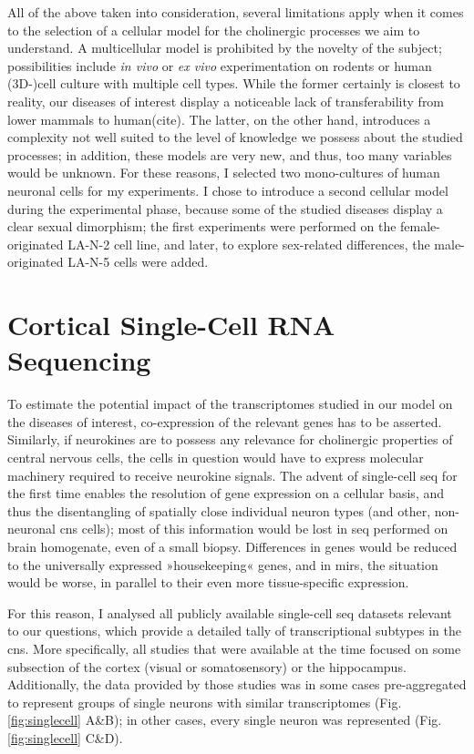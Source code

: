 All of the above taken into consideration, several limitations apply when it comes to the selection of a cellular model for the cholinergic processes we aim to understand. A multicellular model is prohibited by the novelty of the subject; possibilities include \textit{in vivo} or \textit{ex vivo} experimentation on rodents or human (3D-)cell culture with multiple cell types. While the former certainly is closest to reality, our diseases of interest display a noticeable lack of transferability from lower mammals to human(cite). The latter, on the other hand, introduces a complexity not well suited to the level of knowledge we possess about the studied processes; in addition, these models are very new, and thus, too many variables would be unknown. For these reasons, I selected two mono-cultures of human neuronal cells for my experiments. I chose to introduce a second cellular model during the experimental phase, because some of the studied diseases display a clear sexual dimorphism; the first experiments were performed on the female-originated LA-N-2 cell line, and later, to explore sex-related differences, the male-originated LA-N-5 cells were added.

\section{Cortical Single-Cell RNA Sequencing}
To estimate the potential impact of the transcriptomes studied in our model on the diseases of interest, co-expression of the relevant genes has to be asserted. Similarly, if neurokines are to possess any relevance for cholinergic properties of central nervous cells, the cells in question would have to express molecular machinery required to receive neurokine signals. The advent of single-cell \ac{seq} for the first time enables the resolution of gene expression on a cellular basis, and thus the disentangling of spatially close individual neuron types (and other, non-neuronal \ac{cns} cells); most of this information would be lost in \ac{seq} performed on brain homogenate, even of a small biopsy. Differences in genes would be reduced to the universally expressed »housekeeping« genes, and in \acp{mir}, the situation would be worse, in parallel to their even more tissue-specific expression.

For this reason, I analysed all publicly available single-cell \ac{seq} datasets relevant to our questions, which provide a detailed tally of transcriptional subtypes in the \ac{cns}. More specifically, all studies that were available at the time focused on some subsection of the cortex (visual or somatosensory) or the hippocampus. Additionally, the data provided by those studies was in some cases pre-aggregated to represent groups of single neurons with similar transcriptomes (Fig. \ref{fig:singlecell} A\&B\cite{Zeisel2015, Tasic2016}); in other cases, every single neuron was represented (Fig. \ref{fig:singlecell} C\&D\cite{Darmanis2015, Habib2016}). 

